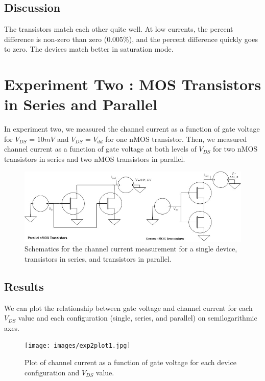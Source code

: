 \documentclass{article}
\begin{document}
\subsection{Discussion}
The transistors match each other quite well. At low currents, the percent difference is non-zero than zero (0.005\%), and the percent difference quickly goes to zero. The devices match better in saturation mode.

\section{Experiment Two : MOS Transistors in Series and Parallel}
In experiment two, we measured the channel current as a function of gate voltage for $V_{DS}$ = $10 mV$ and $V_{DS}$ = $V_{dd}$ for one nMOS transistor. Then, we measured channel current as a function of gate voltage at both levels of $V_{DS}$ for two nMOS transistors in series and two nMOS transistors in parallel.
\begin{figure}[H]   
  \begin{center}       
  \includegraphics[scale = 0.5]{images/exp2_schematic.jpg}
  \caption{Schematics for the channel current measurement for a single device, transistors in series, and transistors in parallel.}
  \label{fig:exp2_sch}
  \end{center}
\end{figure}

\subsection{Results}
We can plot the relationship between gate voltage and channel current for each $V_{DS}$ value and each configuration (single, series, and parallel) on semilogarithmic axes.
\begin{figure}[H]   
  \begin{center}      
  \texttt{[image: images/exp2plot1.jpg]}
  \caption{Plot of channel current as a function of gate voltage for each device configuration and $V_{DS}$ value.}
  \label{fig:exp2_plot1}
  \end{center}
\end{figure}
\end{document}
